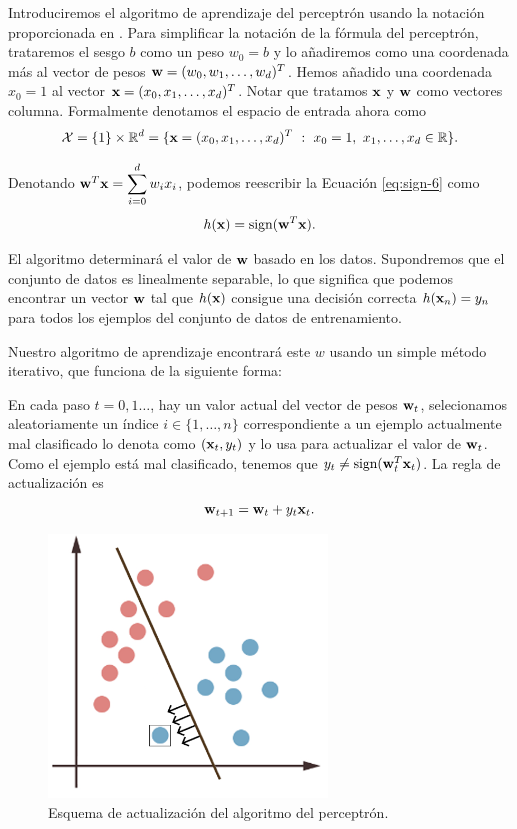\documentclass[oneside,openright,titlepage,numbers=noenddot,openany,headinclude,footinclude=true,
cleardoublepage=empty,abstractoff,BCOR=5mm,paper=a4,fontsize=12pt,main=spanish]{scrreprt}
\begin{document}
Introduciremos el algoritmo de aprendizaje del perceptrón usando la notación proporcionada en \cite{learning2012}. Para simplificar la notación de la fórmula del perceptrón, trataremos el sesgo $b$ como un peso $w_0=b$ y lo añadiremos como una coordenada más al vector de pesos $\textbf{w}=(w_0,w_1,\dots,w_d)^T$. Hemos añadido una coordenada $x_0=1$ al vector $\textbf{x}=(x_0,x_1,\dots,x_d)^T$. Notar que tratamos $\textbf{x}$ y $\textbf{w}$ como vectores columna. Formalmente denotamos el espacio de entrada ahora como $$\mathcal{X}=\{1\}\times \mathbb{R}^d=\{\textbf{x}=(x_0,x_1,\dots,x_d)^T \ : \ x_0=1, \ x_1,\dots,x_d \in \mathbb{R}\}.$$

Denotando $\textbf{w}^T\textbf{x}=\displaystyle \sum_{i=0}^d w_ix_i$, podemos reescribir la Ecuación \ref{eq:sign-6} como $$h(\textbf{x})=\text{sign}(\textbf{w}^T\textbf{x}).$$

El algoritmo determinará el valor de $\textbf{w}$ basado en los datos. Supondremos que el conjunto de datos es linealmente separable, lo que significa que podemos encontrar un vector $\textbf{w}$ tal que $h(\textbf{x})$ consigue una decisión correcta $h(\textbf{x}_n)=y_n$ para todos los ejemplos del conjunto de datos de entrenamiento.

Nuestro algoritmo de aprendizaje encontrará este $w$ usando un simple método iterativo, que funciona de la siguiente forma:

En cada paso $t=0,1\dots$, hay un valor actual del vector de pesos $\textbf{w}_t$, selecionamos aleatoriamente un índice $i\in \{1,\dots,n\}$ correspondiente a un ejemplo actualmente mal clasificado lo denota como $(\textbf{x}_t,y_t)$ y lo usa para actualizar el valor de $\textbf{w}_t$. Como el ejemplo está mal clasificado, tenemos que $y_t\neq \text{sign}(\textbf{w}^T_t\textbf{x}_t)$. La regla de actualización es $$\textbf{w}_{t+1}=\textbf{w}_t+y_t\textbf{x}_t.$$

\begin{figure}[h]
	\centering
	\includegraphics[width=7.4cm]{movclassified.png}
	\caption{Esquema de actualización del algoritmo del perceptrón.}
    \label{fig:movsep}
\end{figure}
\end{document}
